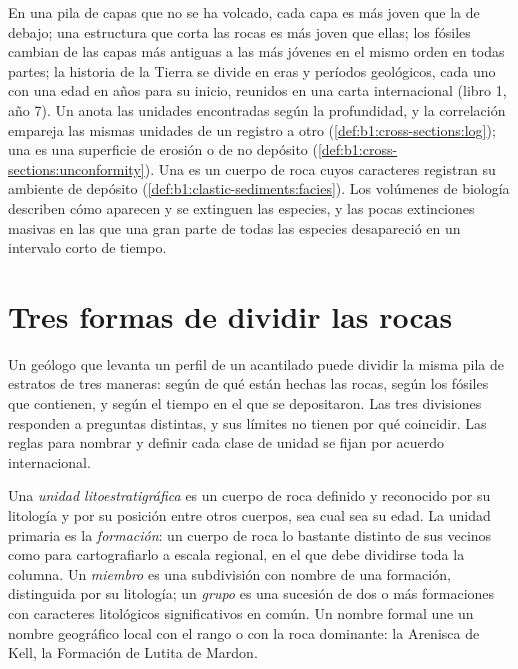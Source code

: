 \begin{recall}
En una pila de capas que no se ha volcado, cada capa es más joven que la de debajo; una estructura que corta las rocas es más joven que ellas; los fósiles cambian de las capas más antiguas a
las más jóvenes en el mismo orden en todas partes; la historia de la Tierra se divide en eras y períodos geológicos, cada uno con una edad en años para su inicio, reunidos en una carta internacional
(libro 1, año 7). Un  anota las unidades encontradas según la profundidad, y la correlación empareja las mismas unidades de un registro a otro (\cref{def:b1:cross-sections:log});
una  es una superficie de erosión o de no depósito (\cref{def:b1:cross-sections:unconformity}). Una  es un cuerpo de roca cuyos caracteres registran su ambiente de depósito
(\cref{def:b1:clastic-sediments:facies}). Los volúmenes de biología describen cómo aparecen y se extinguen las especies, y las pocas extinciones masivas en las que una gran parte de todas las especies
desapareció en un intervalo corto de tiempo.
\end{recall}

\section{Tres formas de dividir las rocas}\label{sec:b1:stratigraphic-scale:three}

Un geólogo que levanta un perfil de un acantilado puede dividir la misma pila de estratos de tres maneras: según de qué están hechas las rocas, según los fósiles que contienen, y según el tiempo
en el que se depositaron. Las tres divisiones responden a preguntas distintas, y sus límites no tienen por qué coincidir. Las reglas para nombrar y definir cada clase de unidad se fijan por acuerdo internacional.

\begin{definition}\label{def:b1:stratigraphic-scale:lithostratigraphy}
Una \emph{unidad litoestratigráfica} es un cuerpo de roca definido y reconocido por su litología y por su posición entre otros cuerpos, sea cual sea su edad. La unidad
primaria es la \emph{formación}: un cuerpo de roca lo bastante distinto de sus vecinos como para cartografiarlo a escala regional, en el que debe dividirse toda la columna.
Un \emph{miembro} es una subdivisión con nombre de una formación, distinguida por su litología; un \emph{grupo} es una sucesión de dos
o más formaciones con caracteres litológicos significativos en común. Un nombre formal une un nombre geográfico local con el rango o con la roca dominante: la Arenisca de Kell, la Formación de Lutita de Mardon.
\end{definition}

